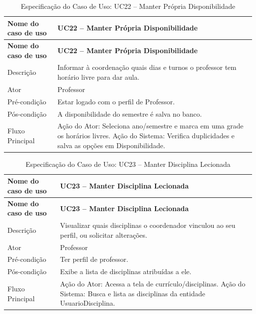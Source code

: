 \fonteautores

\vspace{\baselineskip}

\Needspace{0.48\textheight}
\begin{longtable}{|L{4.5cm}|L{10.5cm}|}
\caption{Especificação do Caso de Uso: UC22 -- Manter Própria Disponibilidade} \\
\hline
\textbf{Nome do caso de uso} & \textbf{UC22 -- Manter Própria Disponibilidade} \\
\hline
\endfirsthead
\hline
\textbf{Nome do caso de uso} & \textbf{UC22 -- Manter Própria Disponibilidade} \\
\hline
\endhead
Descrição       & Informar à coordenação quais dias e turnos o professor tem horário livre para dar aula. \\
\hline
Ator            & Professor \\
\hline
Pré-condição    & Estar logado com o perfil de Professor. \\
\hline
Pós-condição    & A disponibilidade do semestre é salva no banco. \\
\hline
Fluxo Principal & Ação do Ator: Seleciona ano/semestre e marca em uma grade os horários livres. Ação do Sistema: Verifica duplicidades e salva as opções em Disponibilidade. \\
\hline
\end{longtable}

\fonteautores

\vspace{\baselineskip}

\Needspace{0.48\textheight}
\begin{longtable}{|L{4.5cm}|L{10.5cm}|}
\caption{Especificação do Caso de Uso: UC23 -- Manter Disciplina Lecionada} \\
\hline
\textbf{Nome do caso de uso} & \textbf{UC23 -- Manter Disciplina Lecionada} \\
\hline
\endfirsthead
\hline
\textbf{Nome do caso de uso} & \textbf{UC23 -- Manter Disciplina Lecionada} \\
\hline
\endhead
Descrição       & Visualizar quais disciplinas o coordenador vinculou ao seu perfil, ou solicitar alterações. \\
\hline
Ator            & Professor \\
\hline
Pré-condição    & Ter perfil de professor. \\
\hline
Pós-condição    & Exibe a lista de disciplinas atribuídas a ele. \\
\hline
Fluxo Principal & Ação do Ator: Acessa a tela de currículo/disciplinas. Ação do Sistema: Busca e lista as disciplinas da entidade UsuarioDisciplina. \\
\hline
\end{longtable}

